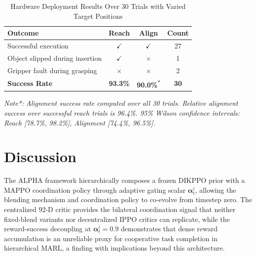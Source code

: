 \documentclass[lettersize,journal]{IEEEtran}
\begin{document}
\begin{table}[t]
\caption{Hardware Deployment Results Over 30 Trials with Varied Target Positions}
\label{hardware_result}
\centering
\footnotesize
\setlength{\tabcolsep}{4pt}
\renewcommand{\arraystretch}{1.2}
\begin{tabular}{l c c c}
\toprule
\textbf{Outcome} & \textbf{Reach} & \textbf{Align} & \textbf{Count} \\
\midrule
Successful execution            & $\checkmark$ & $\checkmark$ & 27 \\
Object slipped during insertion & $\checkmark$ & $\times$     & 1  \\
Gripper fault during grasping   & $\times$     & $\times$     & 2  \\
\midrule
\textbf{Success Rate} & \textbf{93.3\%} & \textbf{90.0\%}\textsuperscript{*} & \textbf{30} \\
\bottomrule
\end{tabular}

\vspace{2pt}
\footnotesize{\textit{Note*:}} \textit{Alignment success rate computed over all 30 trials. Relative alignment success over successful reach trials is 96.4\%. 95\% Wilson confidence intervals: Reach [78.7\%, 98.2\%], Alignment [74.4\%, 96.5\%].}
\end{table}
\section{Discussion}
\label{discussion}
The ALPHA framework hierarchically composes a frozen DIKPPO prior with a MAPPO coordination policy through adaptive gating scalar $\mathbf{\alpha}^{i}_{t}$, allowing the blending mechanism and coordination policy to co-evolve from timestep zero. The centralized 92-D critic provides the bilateral coordination signal that neither fixed-blend variants nor decentralized IPPO critics can replicate, while the reward-success decoupling at $\mathbf{\alpha}^{i}_{t}=0.9$ demonstrates that dense reward accumulation is an unreliable proxy for cooperative task completion in hierarchical MARL, a finding with implications beyond this architecture.
\end{document}
